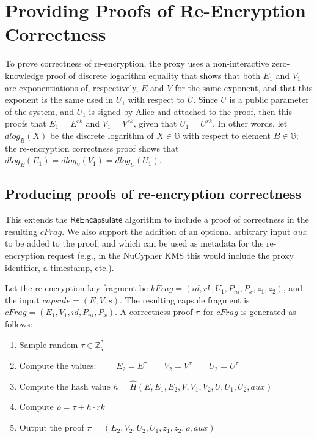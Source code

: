 \documentclass{amsart}
\renewcommand{\P}[1]{P_{#1}}
\newcommand{\G}{\mathbb G}
\begin{document}
\section{Providing Proofs of Re-Encryption Correctness}


To prove correctness of re-encryption, the proxy uses a non-interactive zero-knowledge proof of discrete logarithm equality that shows that both $E_1$ and $V_1$ are exponentiations of, respectively, $E$ and $V$ for the same exponent, and that this exponent is the same used in $U_1$ with respect to $U$. Since $U$ is a public parameter of the system, and $U_1$ is signed by Alice and attached to the proof, then this proofs that $E_1 = E^{rk}$ and $V_1 = V^{rk}$, given that $U_1 = U^{rk}$. In other words, let $dlog_B(X)$ be the discrete logarithm of $X \in \G$ with respect to element $B \in \G$; the re-encryption correctness proof shows that $dlog_E(E_1) = dlog_V(V_1) = dlog_U(U_1)$. 

\subsection{Producing proofs of re-encryption correctness}

This extends the $\mathsf{ReEncapsulate}$ algorithm to include a proof of correctness in the resulting $cFrag$. We also support the addition of an optional arbitrary input $aux$ to be added to the proof, and which can be used as metadata for the re-encryption request (e.g., in the NuCypher KMS this would include the proxy identifier, a timestamp, etc.). 

Let the re-encryption key fragment be $kFrag= (id, rk, U_1, \P{ni}, \P x, z_1, z_2)$, and the input $capsule = (E,V,s)$. The resulting capsule fragment is $cFrag = (E_1, V_1, id, \P{ni}, \P x)$. 
A correctness proof $\pi$ for $cFrag$ is generated as follows:
 \begin{enumerate}
    \item Sample random $\tau \in \mathbb Z_q^*$
    \item Compute the values:
     	$\qquad E_2 = E^{\tau}	\qquad	V_2 = V^\tau	\qquad	U_2 = U^\tau$
	\item Compute the hash value $h = \hat H(E, E_1, E_2, V, V_1, V_2, U, U_1, U_2, aux)$
	\item Compute $\rho = \tau + h\cdot rk$
	\item Output the proof $\pi = (E_2, V_2, U_2, U_1, z_1, z_2, \rho, aux)$
 \end{enumerate}
 
\end{document}
